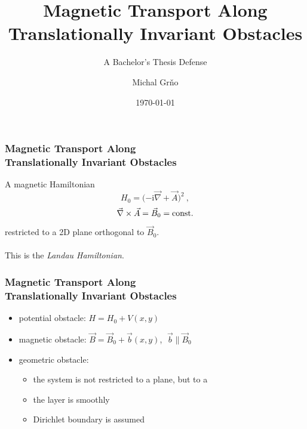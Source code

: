 \documentclass{beamer}
\title[Magnetic Transport]{Magnetic Transport Along \\ Translationally Invariant Obstacles}
\subtitle{A Bachelor's Thesis Defense}
\author{Michal Grňo}
\date{\today}
\renewcommand{\i}{\ensuremath{\mathrm i}}
\begin{document}
\begin{frame}
    \titlepage
\end{frame}

\begin{frame}
    \frametitle{Magnetic \color{gray} Transport Along \\ Translationally Invariant Obstacles}
    \pause
    A magnetic Hamiltonian
    \begin{equation*}
        H_0 = \big({ -\i\vec\nabla + \vec A }\big)^2 \: ,
    \end{equation*}
    \pause\vspace{-\baselineskip}
    \begin{equation*}
        \vec\nabla \times \vec A = \vec B_0 = \text{const.}
        \vspace{5pt}
    \end{equation*}
    \pause
    restricted to a 2D plane orthogonal to $\vec B_0$.
    \\\phantom{.}\\
    \pause
    This is the \textit{Landau Hamiltonian}.
\end{frame}

\begin{frame}
    \frametitle{{\color{gray}Magnetic Transport Along \\ Translationally Invariant} Obstacles}
    \begin{itemize}
        \pause
        \item potential obstacle: $H = H_0 + V(x,y)$
        \pause
        \item magnetic obstacle: $\vec B = \vec B_0 + \vec b(x,y)$\pause, $\; \vec b \parallel \vec B_0$
        \pause
        \item geometric obstacle:
        \begin{itemize}
            \item the system is not restricted to a plane, but to a 
            \pause
            \item the layer is smoothly 
            \pause
            \item Dirichlet boundary is assumed
        \end{itemize}
    \end{itemize}
\end{frame}
\end{document}
